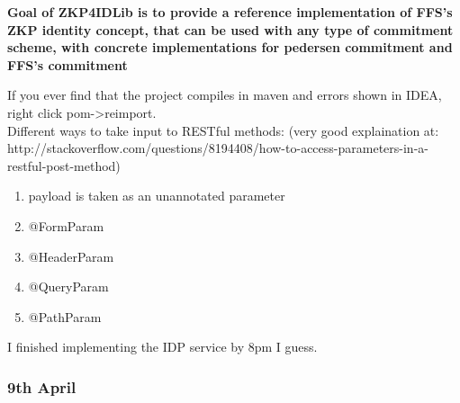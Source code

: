 \documentclass[11pt]{article}
\begin{document}
\textbf{Goal of ZKP4IDLib is to provide a reference implementation of FFS's ZKP identity concept, that can be used with
        any type of commitment scheme, with concrete implementations for pedersen commitment and FFS's commitment}

If you ever find that the project compiles in maven and errors shown in IDEA, right click pom->reimport.\\

Different ways to take input to RESTful methods: (very good explaination at: 
http://stackoverflow.com/questions/8194408/how-to-access-parameters-in-a-restful-post-method)
\begin{enumerate}
 \item payload is taken as an unannotated parameter
 \item @FormParam
 \item @HeaderParam
 \item @QueryParam
 \item @PathParam
\end{enumerate}

I finished implementing the IDP service by 8pm I guess.

\subsubsection*{9th April}
\end{document}
